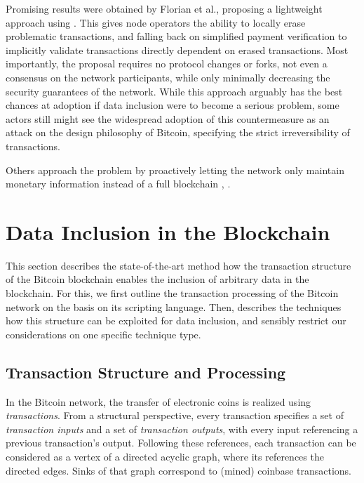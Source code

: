 \documentclass[a4paper,11pt,titlepage]{scrbook}
\begin{document}
Promising results were obtained by Florian et al.\@ \cite{florian_erasing_2019}, proposing a lightweight approach using .
This gives node operators the ability to locally erase problematic transactions, and falling back on simplified payment verification to implicitly validate transactions directly dependent on erased transactions.
Most importantly, the proposal requires no protocol changes or forks, not even a consensus on the network participants, while only minimally decreasing the security guarantees of the network.
While this approach arguably has the best chances at adoption if data inclusion were to become a serious problem, some actors still might see the widespread adoption of this countermeasure as an attack on the design philosophy of Bitcoin, specifying the strict irreversibility of transactions.

Others approach the problem by proactively letting the network only maintain monetary information instead of a full blockchain \cite{chepurnoy_rollerchain_2016}, \cite{bruce_miniblockchain_2017}.


\chapter{Data Inclusion in the Blockchain}\label{chap:problem}

This section describes the state-of-the-art method how the transaction structure of the Bitcoin blockchain enables the inclusion of arbitrary data in the blockchain.
For this, we first outline the transaction processing of the Bitcoin network on the basis on its scripting language. Then, describes the techniques how this structure can be exploited for data inclusion, and sensibly restrict our considerations on one specific technique type.


\section{Transaction Structure and Processing}

In the Bitcoin network, the transfer of electronic coins is realized using \emph{transactions}.
From a structural perspective, every transaction specifies a set of \emph{transaction inputs} and a set of \emph{transaction outputs}, with every input referencing a previous transaction's output.
Following these references, each transaction can be considered as a vertex of a directed acyclic graph, where  its references the directed edges. Sinks of that graph correspond to (mined) coinbase transactions.
\end{document}
